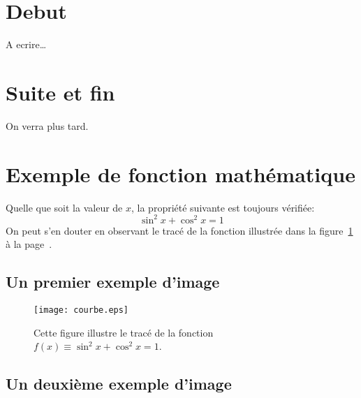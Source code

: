 \documentclass[a4paper,11pt]{article}
\author{Kévin JASON}        %
\begin{document}
\maketitle
\tableofcontents
\section{D\’ebut}
\‘A \’ecrire\dots
\section{Suite et fin}
On verra plus tard.

\maketitle                        %
\newpage
\tableofcontents                  %
\newpage
\section{Exemple de fonction mathématique}            %
Quelle que soit la valeur de $x$,
la propriété suivante est toujours
vérifiée: $$\sin^2 x+\cos^2 x=1$$
On peut s'en douter en observant
le tracé de la fonction illustrée
dans la figure~\ref{courbe}
à la page~\pageref{courbe}.
\newpage
\subsection{Un premier exemple d'image}
\begin{figure}[htbp]
\centering
\texttt{[image: courbe.eps]}
\caption{Cette figure illustre
le tracé de la fonction
$f(x)\equiv\sin^2 x+\cos^2 x=1$.}
\label{courbe}
\end{figure}
\newpage
\subsection{Un deuxième exemple d'image}
\begin{figure}[htbp]
\centering
{}
\end{figure}
\end{document}
